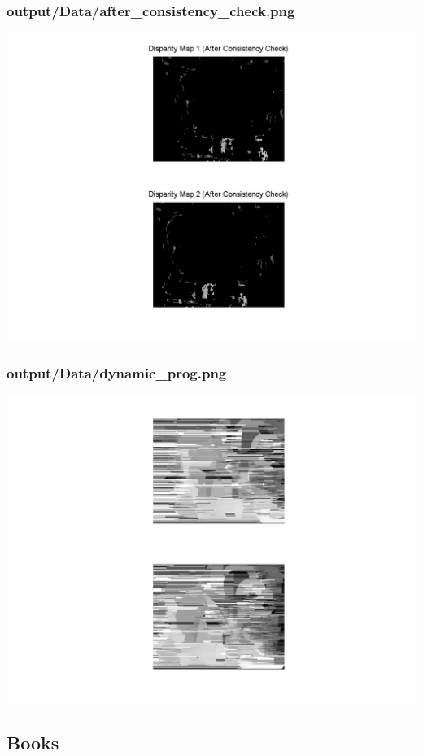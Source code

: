 \subsubsection{output/Data/after\_consistency\_check.png}
    \includegraphics[scale=0.5]{output/Data/after_consistency_check.png}

\subsubsection{output/Data/dynamic\_prog.png}
    \includegraphics[scale=0.5]{output/Data/dynamic_prog.png}

\subsection{Books}
